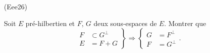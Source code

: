 \begin{tiny}(Eee26)\end{tiny} Soit $E$ pré-hilbertien et $F$, $G$ deux sous-espaces de $E$. Montrer que
\[
 \left. 
 \begin{aligned}
  F &\subset G^\bot \\ E &= F + G 
 \end{aligned}
\right\rbrace \Rightarrow
\left\lbrace 
\begin{aligned}
 G &= F^\bot \\ F &= G^\bot
\end{aligned}
\right. .
\]
